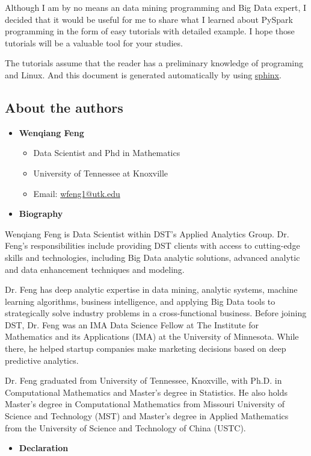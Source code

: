 \documentclass[letterpaper,11pt,english]{sphinxmanual}
\begin{document}
Although I am by no means an data mining programming and Big Data expert,
I decided that it would be useful for me to share what I learned
about PySpark programming in the form of easy tutorials with
detailed example. I hope those tutorials will be a valuable tool
for your studies.

The tutorials assume that the reader has a preliminary knowledge
of programing and Linux. And this document is generated automatically
by using \href{http://sphinx.pocoo.org}{sphinx}.


\subsection{About the authors}
\label{preface:about-the-authors}\begin{itemize}
\item {} 
\textbf{Wenqiang Feng}
\begin{itemize}
\item {} 
Data Scientist and Phd in Mathematics

\item {} 
University of Tennessee at Knoxville

\item {} 
Email: \href{mailto:wfeng1@utk.edu}{wfeng1@utk.edu}

\end{itemize}

\item {} 
\textbf{Biography}

\end{itemize}

Wenqiang Feng is Data Scientist within DST’s Applied Analytics Group. Dr. Feng’s responsibilities include providing DST clients with access to cutting-edge skills and technologies, including Big Data analytic solutions, advanced analytic and data enhancement techniques and modeling.

Dr. Feng has deep analytic expertise in data mining, analytic systems, machine learning algorithms, business intelligence, and applying Big Data tools to strategically solve industry problems in a cross-functional business. Before joining DST, Dr. Feng was an IMA Data Science Fellow at The Institute for Mathematics and its Applications (IMA) at the University of Minnesota. While there, he helped startup companies make marketing decisions based on deep predictive analytics.

Dr. Feng graduated from University of Tennessee, Knoxville, with Ph.D. in Computational Mathematics and Master’s degree in Statistics. He also holds Master’s degree in Computational Mathematics from Missouri University of Science and Technology (MST) and Master’s degree in Applied Mathematics from the University of Science and Technology of China (USTC).
\begin{itemize}
\item {} 
\textbf{Declaration}

\end{itemize}
\end{document}
